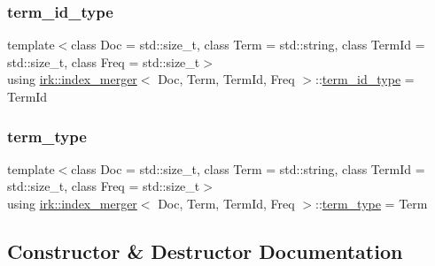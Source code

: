 \mbox{\label{classirk_1_1index__merger_a3731db86b5c514a2dd44555c07abe58e}} 
\subsubsection{\texorpdfstring{term\+\_\+id\+\_\+type}{term\_id\_type}}
{\footnotesize\ttfamily template$<$class Doc = std\+::size\+\_\+t, class Term = std\+::string, class Term\+Id = std\+::size\+\_\+t, class Freq = std\+::size\+\_\+t$>$ \\
using \mbox{\hyperlink{classirk_1_1index__merger}{irk\+::index\+\_\+merger}}$<$ Doc, Term, Term\+Id, Freq $>$\+::\mbox{\hyperlink{classirk_1_1index__merger_a3731db86b5c514a2dd44555c07abe58e}{term\+\_\+id\+\_\+type}} =  Term\+Id}

\mbox{\label{classirk_1_1index__merger_a2b76203064ec60dc3b0fa662fd8aa3f0}} 
\subsubsection{\texorpdfstring{term\+\_\+type}{term\_type}}
{\footnotesize\ttfamily template$<$class Doc = std\+::size\+\_\+t, class Term = std\+::string, class Term\+Id = std\+::size\+\_\+t, class Freq = std\+::size\+\_\+t$>$ \\
using \mbox{\hyperlink{classirk_1_1index__merger}{irk\+::index\+\_\+merger}}$<$ Doc, Term, Term\+Id, Freq $>$\+::\mbox{\hyperlink{classirk_1_1index__merger_a2b76203064ec60dc3b0fa662fd8aa3f0}{term\+\_\+type}} =  Term}



\subsection{Constructor \& Destructor Documentation}
\mbox{\label{classirk_1_1index__merger_abd636b1ba913662b7b917c505715696e}} 
